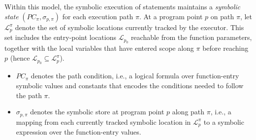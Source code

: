 

Within this model, the symbolic execution of statements maintains a \emph{symbolic state} $(PC_\pi, \sigma_{p,\pi})$ for each execution path $\pi$. 
At a program point $p$ on path $\pi$, let $\mathcal{L}^{\pi}_{p}$ denote the set of symbolic locations currently tracked by the executor. This set includes the entry-point locations $\mathcal{L}_{p_0}$ reachable from the function parameters, together with the local variables that have entered scope along $\pi$ before reaching $p$ (hence $\mathcal{L}_{p_0}\subseteq\mathcal{L}^{\pi}_{p}$). 
\begin{itemize}
\item $PC_\pi$ denotes the path condition, i.e., a logical formula over function-entry symbolic values and constants that encodes the conditions needed to follow the path $\pi$. 
\item $\sigma_{p,\pi}$ denotes the symbolic store at program point $p$
along path $\pi$, i.e., a mapping from each currently tracked symbolic
location in $\mathcal{L}^{\pi}_{p}$ to a symbolic expression over the
function-entry values. 
\end{itemize}

